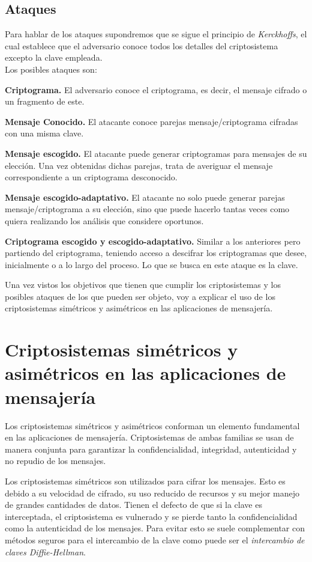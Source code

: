\subsection{Ataques}
Para hablar de los ataques supondremos que se sigue el principio de \emph{Kerckhoffs}, el cual establece que el adversario conoce todos los detalles del criptosistema excepto la clave empleada.\\
Los posibles ataques son:
\begin{description}
		\item \textbf{Criptograma.} El adversario conoce el criptograma, es decir, el mensaje cifrado o un fragmento de este.
		\item \textbf{Mensaje Conocido.} El atacante conoce parejas mensaje/criptograma cifradas con una misma clave.
		\item \textbf{Mensaje escogido.} El atacante puede generar criptogramas para mensajes de su elección. Una vez obtenidas dichas parejas, trata de averiguar el mensaje correspondiente a un criptograma desconocido.
		\item \textbf{Mensaje escogido-adaptativo.} El atacante no solo puede generar parejas mensaje/criptograma a su elección, sino que puede hacerlo tantas veces como quiera realizando los análisis que considere oportunos.
		\item \textbf{Criptograma escogido y escogido-adaptativo.} Similar a los anteriores pero partiendo del criptograma, teniendo acceso a descifrar los criptogramas que desee, inicialmente o a lo largo del proceso. Lo que se busca en este ataque es la clave.
\end{description}

Una vez vistos los objetivos que tienen que cumplir los criptosistemas y los posibles ataques de los que pueden ser objeto, voy a explicar el uso de los criptosistemas simétricos y asimétricos en las aplicaciones de mensajería.\\

\section{Criptosistemas simétricos y asimétricos en las aplicaciones de mensajería}
Los criptosistemas simétricos y asimétricos conforman un elemento fundamental en las aplicaciones de mensajería. Criptosistemas de ambas familias se usan de manera conjunta para garantizar la confidencialidad, integridad, autenticidad y no repudio de los mensajes.

Los criptosistemas simétricos son utilizados para cifrar los mensajes. Esto es debido a su velocidad de cifrado, su uso reducido de recursos y su mejor manejo de grandes cantidades de datos.
Tienen el defecto de que si la clave es interceptada, el criptosistema es vulnerado y se pierde tanto la confidencialidad como la autenticidad de los mensajes. 
Para evitar esto se suele complementar con métodos seguros para el intercambio de la clave como puede ser el \emph{intercambio de claves Diffie-Hellman}.

